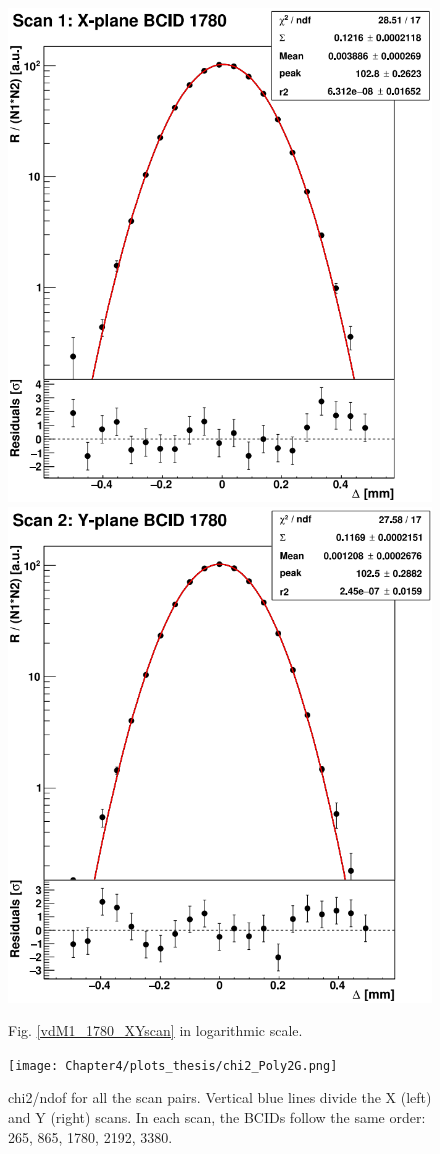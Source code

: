 \begin{center}
\begin{figure}[ht]
\centering
\includegraphics[width=.39\textwidth]{Chapter4/plots/xscan_logy.png}
\includegraphics[width=.39\textwidth]{Chapter4/plots/yscan_logy.png}
\caption[vdM1 BCID 1780 (logarithmic scale)]{Fig. \ref{vdM1_1780_XYscan} in logarithmic scale.}
\label{vdM1_1780_XYscan_logy}
\end{figure}
\end{center}

\begin{center}
  \begin{figure}[ht]
    \centering
    \texttt{[image: Chapter4/plots\_thesis/chi2\_Poly2G.png]}
    \caption[chi2/ndof for all scan pairs]{ chi2/ndof for all the scan pairs. Vertical blue lines divide the X (left) and Y (right) scans. In each scan, the BCIDs follow the same order: 265, 865, 1780, 2192, 3380.} %
    \label{chi2/ndof}
  \end{figure}
\end{center}

